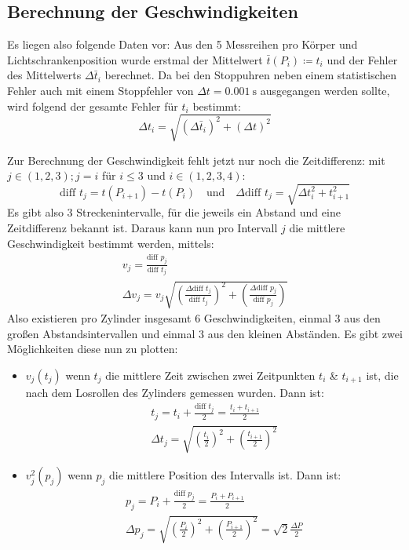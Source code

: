 \subsection{Berechnung der Geschwindigkeiten}
\label{sec:Geschwindigkeitsberechnung}
Es liegen also folgende Daten vor: Aus den 5 Messreihen pro Körper und Lichtschrankenposition wurde erstmal der Mittelwert \(\bar{t}(P_i)\coloneq t_i\) und der Fehler des Mittelwerts \(\Delta \bar{t}_i\) berechnet. Da bei den Stoppuhren neben einem statistischen Fehler auch mit einem Stoppfehler von \(\Delta t=\qty{0.001}{\s}\) ausgegangen werden sollte, wird folgend der gesamte Fehler für \(t_i\) bestimmt:
\begin{equation}
  \Delta t_i=\sqrt{(\Delta \bar{t}_i)^2+(\Delta t)^2}
\end{equation}

Zur Berechnung der Geschwindigkeit fehlt jetzt nur noch die Zeitdifferenz: mit \(j\in(1,2,3); j=i\) für \(i\leq3\) und \(i\in(1,2,3,4)\):
\begin{equation}
  \text{diff }t_j=t(P_{i+1})-t(P_i)\quad\text{und}\quad\Delta \text{diff }t_j=\sqrt{\Delta t_i^2+t_{i+1}^2}
\end{equation}
Es gibt also 3 Streckenintervalle, für die jeweils ein Abstand und eine Zeitdifferenz bekannt ist. Daraus kann nun pro Intervall \(j\) die mittlere Geschwindigkeit bestimmt werden, mittels:
\begin{gather}
  v_j=\frac{\text{diff }p_j}{\text{diff }t_j}\\
  \Delta v_j=v_j\sqrt{\left(\frac{\Delta \text{diff }t_j}{\text{diff }t_j}\right)^2+\left(\frac{\Delta \text{diff }p_j}{\text{diff }p_j}\right)}
\end{gather}
Also existieren pro Zylinder insgesamt 6 Geschwindigkeiten, einmal 3 aus den großen Abstandsintervallen und einmal 3 aus den kleinen Abständen.
Es gibt zwei Möglichkeiten diese nun zu plotten: \begin{itemize}
  \item \(v_j(t_j)\) wenn \(t_j\) die mittlere Zeit zwischen zwei Zeitpunkten \(t_i\) \& \(t_{i+1}\) ist, die nach dem Losrollen des Zylinders gemessen wurden. Dann ist:\begin{gather}
  t_j=t_i+\frac{\text{diff }t_j}{2}=\frac{t_i+t_{i+1}}{2}\\
    \Delta t_j=\sqrt{\left(\frac{t_i}{2}\right)^2+\left(\frac{t_{i+1}}{2}\right)^2}
  \end{gather}
\item  \(v_j^2(p_j)\) wenn \(p_j\) die mittlere Position des Intervalls ist. 
  Dann ist:\begin{gather}
    p_j=P_i+\frac{\text{diff }p_j}{2}=\frac{P_i+P_{i+1}}{2}\\
    \Delta p_j=\sqrt{\left(\frac{P_i}{2}\right)^2+\left(\frac{P_{i+1}}{2}\right)^2}=\sqrt{2}\frac{\Delta P}{2}
  \end{gather} 
\end{itemize}
